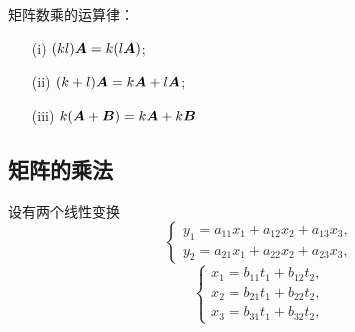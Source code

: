 \begin{zhu}
\end{zhu}

矩阵数乘的运算律：
\begin{itemize}
\item[(i)] $(k l)\boldsymbol{A} =  k(l \boldsymbol{A})$;
\item[(ii)] $(k + l) \boldsymbol{A}  = k \boldsymbol{A} + l \boldsymbol{A}$;
\item[(iii)] $k (\boldsymbol{A} + \boldsymbol{B})  = k \boldsymbol{A} + k \boldsymbol{B}$
\end{itemize}

\subsection{矩阵的乘法}


设有两个线性变换
\begin{equation}\label{lt1}
  \left\{
    \begin{array}{l}
      y_1 = a_{11} x_1 + a_{12} x_2 + a_{13} x_3, \\[0.2cm]
      y_2 = a_{21} x_1 + a_{22} x_2 + a_{23} x_3,
    \end{array}
  \right.
\end{equation}
\begin{equation}\label{lt2}
  \left\{
    \begin{array}{l}
      x_1 = b_{11} t_1 + b_{12} t_2 , \\[0.2cm]
      x_2 = b_{21} t_1 + b_{22} t_2 , \\[0.2cm]
      x_3 = b_{31} t_1 + b_{32} t_2 , 
    \end{array}
  \right.
\end{equation}

